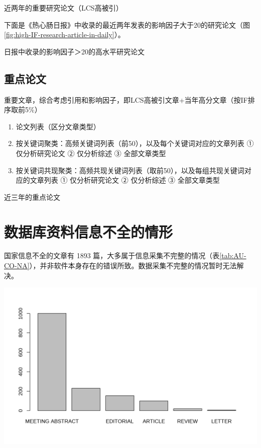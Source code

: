 \documentclass[]{ctexbook}
\providecommand{\tightlist}{%
  \setlength{\itemsep}{0pt}\setlength{\parskip}{0pt}}
\begin{document}
\label{fig:recent-LCS-research-article}近两年的重要研究论文（LCS高被引）

下面是《热心肠日报》中收录的最近两年发表的影响因子大于20的研究论文（图 \ref{fig:high-IF-research-article-in-daily}）。

\hypertarget{htmlwidget-dfef4cc4d88358ff3529}{}

\label{fig:high-IF-research-article-in-daily}日报中收录的影响因子＞20的高水平研究论文

\hypertarget{ux91cdux70b9ux8bbaux6587}{%
\subsection{重点论文}\label{ux91cdux70b9ux8bbaux6587}}

重要文章，综合考虑引用和影响因子，即LCS高被引文章+当年高分文章（按IF排序取前5\%）

\begin{enumerate}
\def\labelenumi{\arabic{enumi}.}
\tightlist
\item
  论文列表（区分文章类型）
\item
  按关键词聚类：高频关键词列表（前50），以及每个关键词对应的文章列表
  ① 仅分析研究论文
  ② 仅分析综述
  ③ 全部文章类型
\item
  按关键词共现聚类：高频共现关键词列表（取前50），以及每组共现关键词对应的文章列表
  ① 仅分析研究论文
  ② 仅分析综述
  ③ 全部文章类型
\end{enumerate}

\hypertarget{htmlwidget-309b49d98c1d46f76bc5}{}

\label{fig:unnamed-chunk-62}近三年的重点论文

\hypertarget{ux6570ux636eux5e93ux8d44ux6599ux4fe1ux606fux4e0dux5168ux7684ux60c5ux5f62}{%
\section{数据库资料信息不全的情形}\label{ux6570ux636eux5e93ux8d44ux6599ux4fe1ux606fux4e0dux5168ux7684ux60c5ux5f62}}

国家信息不全的文章有 1893 篇，大多属于信息采集不完整的情况（表\ref{tab:AU-CO-NA}），并非软件本身存在的错误所致。数据采集不完整的情况暂时无法解决。

\includegraphics[width=1\linewidth]{plots/unnamed-chunk-65-1}
\end{document}
